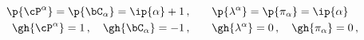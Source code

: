 \begin{equation}
  \begin{split}
    \p{\cP^\alpha}=\p{\bC_\alpha}=\ip{\alpha}+1\,, \qquad
    &\p{\lambda^\alpha}=\p{\pi_\alpha}=\ip{\alpha}\\
    \gh{\cP^\alpha}=1 \,, \quad \gh{\bC_\alpha}=-1\,, \qquad
    &\gh{\lambda^\alpha}=0\,, \quad \gh{\pi_\alpha}=0\,,
\end{split}
\end{equation}

